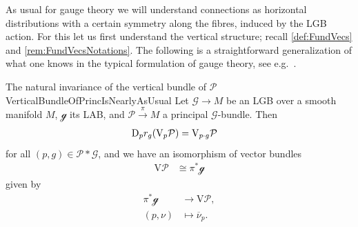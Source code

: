 \documentclass[reqno,a4paper,oneside]{amsart}
\theoremstyle{plain}
\theoremstyle{remark}
\theoremstyle{definition}
\begin{document}
As usual for gauge theory we will understand connections as horizontal distributions with a certain symmetry along the fibres, induced by the LGB action. For this let us first understand the vertical structure; recall \ref{def:FundVecs} and \ref{rem:FundVecsNotations}. The following is a straightforward generalization of what one knows in the typical formulation of gauge theory, see e.g.\ \cite[\S 5.1, part 2 to 4 of Prop.\ 5.1.3, page 258f]{Hamilton}.

\begin{corollaries}{The natural invariance of the vertical bundle of $\mathcal{P}$}{VerticalBundleOfPrincIsNearlyAsUsual}
Let $\mathcal{G} \to M$ be an LGB over a smooth manifold $M$, $\mathcal{g}$ its LAB, and $\mathcal{P}\stackrel{\pi}{\to} M$ a principal $\mathcal{G}$-bundle. Then
\begin{align*}
\mathrm{D}_p r_g\mleft( \mathrm{V}_p \mathcal{P} \mright)
&=
\mathrm{V}_{p \cdot g} \mathcal{P}
\end{align*}
for all $(p, g) \in \mathcal{P} * \mathcal{G}$, and we have an isomorphism of vector bundles
\begin{align*}
\mathrm{V}\mathcal{P}
&\cong
\pi^*\mathcal{g}
\end{align*}
given by
\begin{align*}
\pi^*\mathcal{g} &\to \mathrm{V}\mathcal{P},\nonumber\\
(p, \nu) &\mapsto \overline{\nu}_p.
\end{align*}
\end{corollaries}
\end{document}
